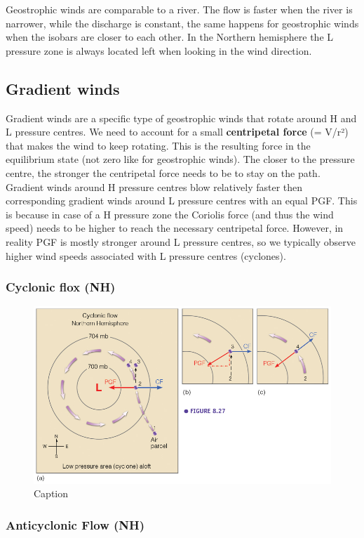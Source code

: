 \documentclass[oneside]{book}
\begin{document}
Geostrophic winds are comparable to a river. The flow is faster when the
river is narrower, while the discharge is constant, the same happens for
geostrophic winds when the isobars are closer to each other. In the
Northern hemisphere the L pressure zone is always located left when
looking in the wind direction.

\subsection{Gradient winds}\label{gradient-winds}

Gradient winds are a specific type of geostrophic winds that rotate
around H and L pressure centres. We need to account for a small
\textbf{centripetal force} (= V/r²) that makes the wind to keep
rotating. This is the resulting force in the equilibrium state (not zero
like for geostrophic winds). The closer to the pressure centre, the
stronger the centripetal force needs to be to stay on the path. Gradient
winds around H pressure centres blow relatively faster then
corresponding gradient winds around L pressure centres with an equal
PGF. This is because in case of a H pressure zone the Coriolis force
(and thus the wind speed) needs to be higher to reach the necessary
centripetal force. However, in reality PGF is mostly stronger around L
pressure centres, so we typically observe higher wind speeds associated
with L pressure centres (cyclones).

\subsubsection{Cyclonic flox (NH)}\label{cyclonic-flox-nh}

\begin{figure}

{\centering \includegraphics[width=0.4\linewidth]{figures/Figure410} 

}

\caption{Caption}\label{fig:CF}
\end{figure}

\subsubsection{Anticyclonic Flow (NH)}\label{anticyclonic-flow-nh}
\end{document}
